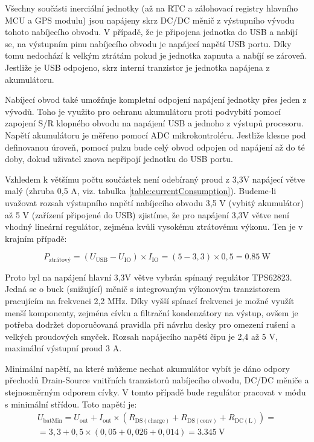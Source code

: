 Všechny součásti inerciální jednotky (až na \ac{RTC} a zálohovací registry hlavního \ac{MCU} a \ac{GPS} modulu) jsou napájeny skrz DC/DC měnič z výstupního vývodu tohoto nabíjecího obvodu. V případě, že je připojena jednotka do \ac{USB} a nabíjí se, na výstupním pinu nabíjecího obvodu je napájecí napětí USB portu. Díky tomu nedochází k velkým ztrátám pokud je jednotka zapnuta a nabíjí se zároveň. Jestliže je \ac{USB} odpojeno, skrz interní tranzistor je jednotka napájena z akumulátoru. \cite{F5eZCtr2LLRsr9NT}

Nabíjecí obvod také umožňuje kompletní odpojení napájení jednotky přes jeden z vývodů. Toho je využito pro ochranu akumulátoru proti podvybití pomocí zapojení S/R klopného obvodu na napájení \ac{USB} a jednoho z výstupů procesoru. Napětí akumulátoru je měřeno pomocí \ac{ADC} mikrokontroléru. Jestliže klesne pod definovanou úroveň, pomocí pulzu bude celý obvod odpojen od napájení až do té doby, dokud uživatel znova nepřipojí jednotku do \ac{USB} portu.



Vzhledem k většímu počtu součástek není odebíraný proud z 3,3V napájecí větve malý (zhruba 0,5 A, viz. tabulka \ref{table:currentConsumption}). Budeme-li uvažovat rozsah výstupního napětí nabíjecího obvodu 3,5 V (vybitý akumulátor) až 5 V (zařízení připojené do \ac{USB}) zjistíme, že pro napájení 3,3V větve není vhodný lineární regulátor, zejména kvůli vysokému ztrátovému výkonu. Ten je v krajním případě:

\begin{equation}
P_{\mathrm{ztrátový}} = (U_{\mathrm{USB}}-U_{\mathrm{IO}})\times I_{\mathrm{IO}}=(5-3,3)\times 0,5= \SI{0,85}{\watt}
\end{equation}

Proto byl na napájení hlavní 3,3V větve vybrán spínaný regulátor TPS62823. Jedná se o buck (snižující) měnič s integrovaným výkonovým tranzistorem pracujícím na frekvenci 2,2 MHz. Díky vyšší spínací frekvenci je možné využít menší komponenty, zejména cívku a filtrační kondenzátory na výstup, ovšem je potřeba dodržet doporučovaná pravidla při návrhu desky pro omezení rušení a velkých proudových smyček. Rozsah napájecího napětí čipu je 2,4 až 5 V, maximální výstupní proud 3 A. \cite{mGnys3WmOkWuaQHN}

Minimální napětí, na které můžeme nechat akumulátor vybít je dáno odpory přechodů Drain-Source vnitřních tranzistorů nabíjecího obvodu, DC/DC měniče a stejnosměrným odporem cívky. V tomto případě bude regulátor pracovat v módu s minimální střídou. \cite{mGnys3WmOkWuaQHN} Toto napětí je:
\begin{equation}
\begin{matrix}
 U_{\mathrm{batMin}} = U_{\mathrm{out}} + I_{\mathrm{out}} \times (R_{\mathrm{DS(charge)}} + R_{\mathrm{DS(conv)}} + R_{\mathrm{DC(L)}})= \\
  =3,3 + 0,5 \times (0,05 + 0,026 + 0,014) = \SI{3,345}{\volt}
\end{matrix}
 \end{equation}

